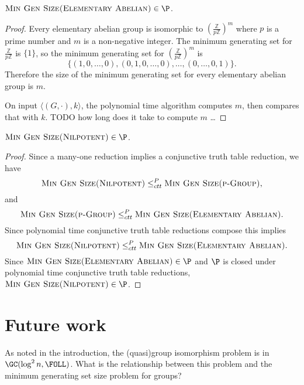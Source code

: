 \documentclass{article}
\begin{document}
\begin{lemma}
  $\textsc{Min Gen Size(Elementary Abelian)} \in \P$.
\end{lemma}
\begin{proof}
  Every elementary abelian group is isomorphic to $(\frac{\mathbb{Z}}{p\mathbb{Z}})^m$ where $p$ is a prime number and $m$ is a non-negative integer.
  The minimum generating set for $\frac{\mathbb{Z}}{p\mathbb{Z}}$ is $\{1\}$, so the minimum generating set for $(\frac{\mathbb{Z}}{p\mathbb{Z}})^m$ is
  \[
  \{(1, 0, \dotsc, 0), (0, 1, 0, \dotsc, 0), \dotsc, (0, \dotsc, 0, 1)\}.
  \]
  Therefore the size of the minimum generating set for every elementary abelian group is $m$.

  On input $\langle (G, \cdot), k \rangle$, the polynomial time algorithm computes $m$, then compares that with $k$.
  TODO how long does it take to compute $m$ \ldots
\end{proof}

\begin{theorem}
  $\textsc{Min Gen Size(Nilpotent)} \in \P$.
\end{theorem}
\begin{proof}
  Since a many-one reduction implies a conjunctive truth table reduction, we have
  \begin{equation*}
    \textsc{Min Gen Size(Nilpotent)} \leq_{ctt}^P \textsc{Min Gen Size(p-Group)},
  \end{equation*}
  and
  \begin{equation*}
    \textsc{Min Gen Size(p-Group)} \leq_{ctt}^P \textsc{Min Gen Size(Elementary Abelian)}.
  \end{equation*}
  Since polynomial time conjunctive truth table reductions compose this implies
  \begin{equation*}
    \textsc{Min Gen Size(Nilpotent)} \leq_{ctt}^P \textsc{Min Gen Size(Elementary Abelian)}.
  \end{equation*}
  Since $\textsc{Min Gen Size(Elementary Abelian)} \in \P$ and $\P$ is closed under polynomial time conjunctive truth table reductions, $\textsc{Min Gen Size(Nilpotent)} \in \P$.
\end{proof}

\section{Future work}

As noted in the introduction, the (quasi)group isomorphism problem is in $\GC(\log^2 n, \FOLL)$.
What is the relationship between this problem and the minimum generating set size problem for groups?
\end{document}
